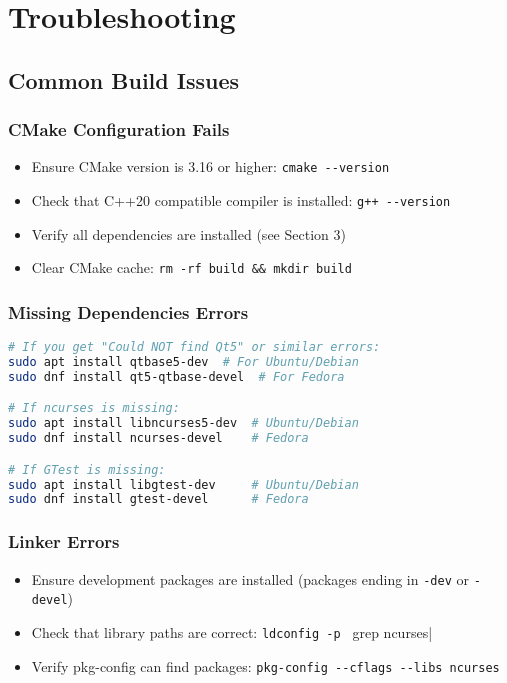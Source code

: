 \documentclass[12pt]{article}
\begin{document}
\section{Troubleshooting}

\subsection{Common Build Issues}

\subsubsection{CMake Configuration Fails}
\begin{itemize}
\item Ensure CMake version is 3.16 or higher: \verb|cmake --version|
\item Check that C++20 compatible compiler is installed: \verb|g++ --version|
\item Verify all dependencies are installed (see Section 3)
\item Clear CMake cache: \verb|rm -rf build && mkdir build|
\end{itemize}

\subsubsection{Missing Dependencies Errors}
\begin{lstlisting}[language=bash]
# If you get "Could NOT find Qt5" or similar errors:
sudo apt install qtbase5-dev  # For Ubuntu/Debian
sudo dnf install qt5-qtbase-devel  # For Fedora

# If ncurses is missing:
sudo apt install libncurses5-dev  # Ubuntu/Debian
sudo dnf install ncurses-devel    # Fedora

# If GTest is missing:
sudo apt install libgtest-dev     # Ubuntu/Debian
sudo dnf install gtest-devel      # Fedora
\end{lstlisting}

\subsubsection{Linker Errors}
\begin{itemize}
\item Ensure development packages are installed (packages ending in \texttt{-dev} or \texttt{-devel})
\item Check that library paths are correct: \verb|ldconfig -p | grep ncurses|
\item Verify pkg-config can find packages: \verb|pkg-config --cflags --libs ncurses|
\end{itemize}
\end{document}
